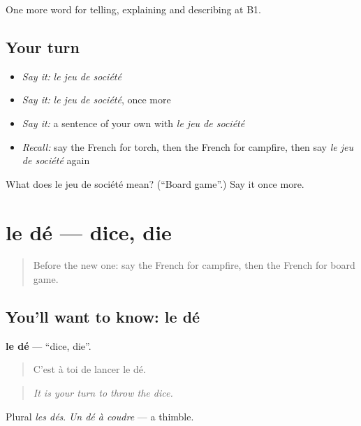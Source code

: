 \begin{grammarlens}[title={What you've built}]
One more word for telling, explaining and describing at B1.
\end{grammarlens}

\subsection*{Your turn}
\begin{itemize}
\raggedright
  \item \emph{Say it:} \emph{le jeu de société}
  \item \emph{Say it:} \emph{le jeu de société}, once more
  \item \emph{Say it:} a sentence of your own with \emph{le jeu de société}
  \item \emph{Recall:} say the French for torch, then the French for campfire, then say \emph{le jeu de société} again
\end{itemize}

\begin{tcolorbox}[breakable,colback=teal!4,colframe=teal!35!black,title={Before you move on}]
What does le jeu de société mean? (\textquotedblleft{}Board game\textquotedblright{}.) Say it once more.
\end{tcolorbox}
\section[le dé]{le dé — dice, die}

\label{lesson:FR-C499-de}



\begin{quote}
Before the new one: say the French for campfire, then the French for board game.
\end{quote}

\subsection*{You'll want to know: le dé}
\textbf{le dé} — \textquotedblleft{}dice, die\textquotedblright{}.

\begin{quote}
C'est à toi de lancer le dé.
\end{quote}

\begin{quote}
\emph{It is your turn to throw the dice.}
\end{quote}

Plural \emph{les dés}. \emph{Un dé à coudre} — a thimble.

